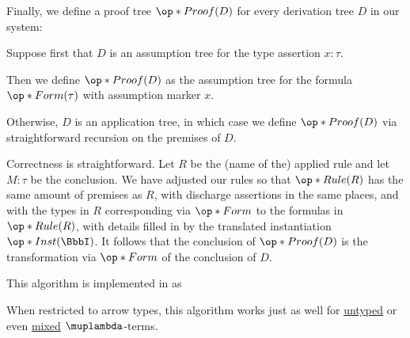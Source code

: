 \begin{algorithm}
\begin{thmenum}
     Finally, we define a proof tree \( \op*{Proof}(D) \) for every derivation tree \( D \) in our system:
    \begin{thmenum}
       Suppose first that \( D \) is an assumption tree for the type assertion \( x: \tau \).

      Then we define \( \op*{Proof}(D) \) as the assumption tree for the formula \( \op*{Form}(\tau) \) with assumption marker \( x \).

       Otherwise, \( D \) is an application tree, in which case we define \( \op*{Proof}(D) \) via straightforward recursion on the premises of \( D \).

      Correctness is straightforward. Let \( R \) be the (name of the) applied rule and let \( M: \tau \) be the conclusion. We have adjusted our rules so that \( \op*{Rule}(R) \) has the same amount of premises as \( R \), with discharge assertions in the same places, and with the types in \( R \) corresponding via \( \op*{Form} \) to the formulas in \( \op*{Rule}(R) \), with details filled in by the translated instantiation \( \op*{Inst}(\BbbI) \). It follows that the conclusion of \( \op*{Proof}(D) \) is the transformation via \( \op*{Form} \) of the conclusion of \( D \).
    \end{thmenum}
  \end{thmenum}
\end{algorithm}
\begin{comments}
  \item This algorithm is implemented in \cite{notebook:code} as
  \begin{CodeRefDisplay}
  \end{CodeRefDisplay}

  \item When restricted to arrow types, this algorithm works just as well for \hyperref[def:lambda_term]{untyped} or even \hyperref[rem:mixed_lambda_term]{mixed} \( \muplambda \)-terms.
\end{comments}


